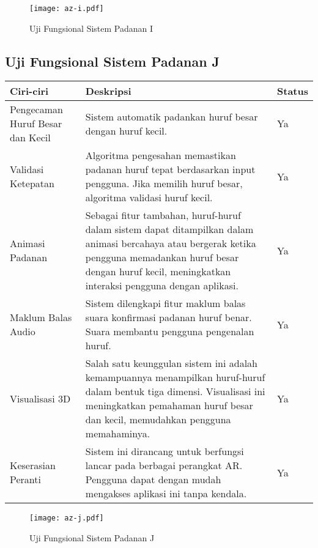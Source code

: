 \begin{itemize}
\begin{itemize}
\begin{itemize}
\begin{itemize}
\begin{itemize}
\begin{itemize}
\begin{itemize}
\begin{itemize}
\begin{flushleft}
\begin{figure}
    \centering
    \texttt{[image: az-i.pdf]}
    \caption{Uji Fungsional  Sistem Padanan I }
    \label{fig:az-h.pdf}
\end{figure}
\clearpage


\subsection{Uji Fungsional  Sistem Padanan J}

\begin{tabular}{>{\raggedright}p{3cm}p{9cm}>{\centering\arraybackslash}p{2cm}}
\toprule
\textbf{Ciri-ciri} & \textbf{Deskripsi} & \textbf{Status} \\
\midrule
Pengecaman Huruf Besar dan Kecil & Sistem automatik padankan huruf besar dengan huruf kecil. & Ya \\

Validasi Ketepatan & Algoritma pengesahan memastikan padanan huruf tepat berdasarkan input pengguna. Jika memilih huruf besar, algoritma validasi huruf kecil. & Ya \\

Animasi Padanan & Sebagai fitur tambahan, huruf-huruf dalam sistem dapat ditampilkan dalam animasi bercahaya atau bergerak ketika pengguna memadankan huruf besar dengan huruf kecil, meningkatkan interaksi pengguna dengan aplikasi. & Ya \\

Maklum Balas Audio & Sistem dilengkapi fitur maklum balas suara konfirmasi padanan huruf benar. Suara membantu pengguna pengenalan huruf. & Ya \\

Visualisasi 3D & Salah satu keunggulan sistem ini adalah kemampuannya menampilkan huruf-huruf dalam bentuk tiga dimensi. Visualisasi ini meningkatkan pemahaman huruf besar dan kecil, memudahkan pengguna memahaminya. & Ya \\

Keserasian Peranti & Sistem ini dirancang untuk berfungsi lancar pada berbagai perangkat AR. Pengguna dapat dengan mudah mengakses aplikasi ini tanpa kendala. & Ya \\
\bottomrule
\end{tabular}

\begin{figure}
    \centering
    \texttt{[image: az-j.pdf]}
    \caption{Uji Fungsional  Sistem Padanan J }
    \label{fig:az-j.pdf}
\end{figure}
\clearpage


\end{flushleft}
\end{itemize}
\end{itemize}
\end{itemize}
\end{itemize}
\end{itemize}
\end{itemize}
\end{itemize}
\end{itemize}
